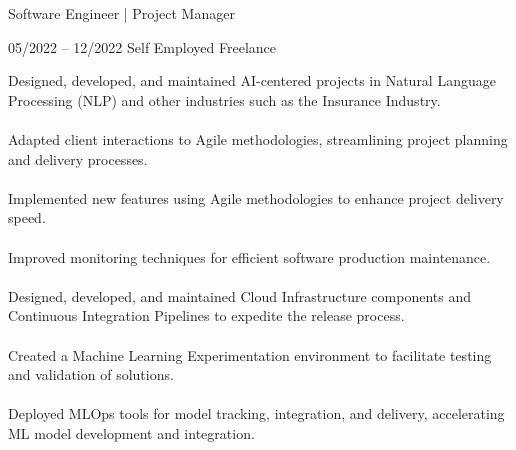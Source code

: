 \documentclass[9pt, green]{template/developercv} %
\begin{document}
{\begin{entrylist}
{	
}
{Software Engineer | Project Manager}

	\entry
	{05/2022 -- 12/2022 }
	{}
	{Self Employed \space\cpipe\space Freelance}
	{
		\vspace{0.3mm}
		\begin{minipage}[t]{0.75\textwidth}				
			\vspace{-\baselineskip}
            \itemmarker Designed, developed, and maintained AI-centered projects in Natural Language Processing (NLP) and other industries such as the Insurance Industry.\\
            \vspace{-3mm}\\
            \itemmarker Adapted client interactions to Agile methodologies, streamlining project planning and delivery processes.\\
            \vspace{-3mm}\\
            \itemmarker Implemented new features using Agile methodologies to enhance project delivery speed.\\
            \vspace{-3mm}\\
            \itemmarker Improved monitoring techniques for efficient software production maintenance.\\
            \vspace{-3mm}\\
            \itemmarker Designed, developed, and maintained Cloud Infrastructure components and Continuous Integration Pipelines to expedite the release process.\\
            \vspace{-3mm}\\
            \itemmarker Created a Machine Learning Experimentation environment to facilitate testing and validation of solutions.\\
            \vspace{-3mm}\\
            \itemmarker Deployed MLOps tools for model tracking, integration, and delivery, accelerating ML model development and integration.\\
            \vspace{-3mm}\\       
		\end{minipage}

}
\end{entrylist}}
\end{document}
